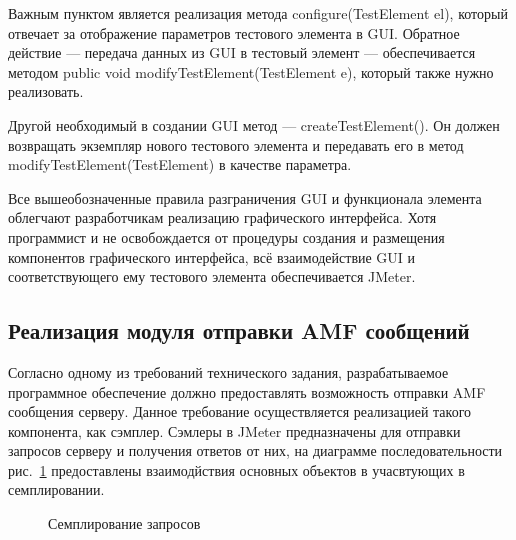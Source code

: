 Важным пунктом является реализация метода configure(TestElement el), который отвечает за отображение
параметров тестового элемента в GUI. Обратное действие --- передача данных из GUI в тестовый
элемент --- обеспечивается методом public void modifyTestElement(TestElement e),
который также нужно реализовать.

Другой необходимый в создании GUI метод --- createTestElement(). Он должен возвращать экземпляр нового
тестового элемента и передавать его в метод modifyTestElement(TestElement) в качестве параметра.

Все вышеобозначенные правила разграничения GUI и функционала элемента облегчают разработчикам реализацию графического
интерфейса. Хотя программист и не освобождается от процедуры создания и размещения компонентов графического
интерфейса, всё взаимодействие GUI и соответствующего ему тестового элемента обеспечивается JMeter.

\subsection{Реализация модуля отправки AMF сообщений}

Согласно одному из требований технического задания, разрабатываемое программное обеспечение должно предоставлять
возможность отправки AMF сообщения серверу. Данное требование осуществляется реализацией такого компонента, как
сэмплер. Сэмлеры в JMeter предназначены для отправки запросов серверу и получения ответов от них, на диаграмме
последовательности рис.~\ref{ris:Diagram4.png} предоставлены взаимодйствия основных объектов в учасвтующих в
семплировании.

\begin{figure}
\caption{Семплирование запросов}
\label{ris:Diagram4.png}
\end{figure}

